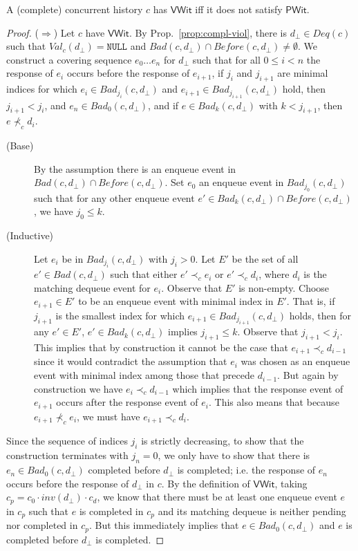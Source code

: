 \documentclass{LMCS}
\newcommand{\NULL}{\ensuremath{\mathtt{NULL}}}
\newcommand{\Deq}[1]{\ensuremath{\mathit{Deq}({#1})}}
\newcommand{\Before}[2]{\ensuremath{\mathit{Before}({#1},{#2})}}
\newcommand{\Val}[2]{\ensuremath{\mathit{Val}_{#1}({#2})}}
\newcommand{\Bad}[2]{\ensuremath{\mathit{Bad}(#1,#2)}}
\newcommand{\Badx}[3]{\ensuremath{\mathit{Bad}_{#3}(#1,#2)}}
\newcommand{\dhat}{\ensuremath{d_{\bot}}}
\newcommand\mylabel[1]{\label{#1}}
\newcommand{\VWit}{\ensuremath{\mathsf{VWit}}}
\newcommand{\PWit}{\ensuremath{\mathsf{PWit}}}
\begin{document}
\begin{lem}\mylabel{lem:vwit-pwit}
A (complete) concurrent history $c$ has {\VWit} iff it does not satisfy {\PWit}.
\end{lem}
\begin{proof}
($\Rightarrow$)
Let $c$ have {\VWit}.
By Prop.~\ref{prop:compl-viol}, there is $\dhat\in \Deq c$ such that $\Val c \dhat=\NULL$ and $\Bad c {\dhat}\cap \Before c {\dhat}\neq \emptyset$.
We construct a covering sequence $e_0\ldots e_n$ for $\dhat$ such that for all $0\leq i< n$ the response of $e_i$ occurs before the response of $e_{i+1}$, if $j_i$ and $j_{i+1}$ are minimal indices for which $e_i\in \Badx c {\dhat} {j_i}$ and $e_{i+1}\in \Badx c {\dhat} {j_{i+1}}$ hold, then $j_{i+1}<j_i$, and $e_n\in \Badx c {\dhat} 0$, and if $e\in \Badx c {\dhat} k$ with $k<j_{i+1}$, then $e\not\prec_c d_i$.

\begin{description}
\item[(Base)] By the assumption there is an enqueue event in $\Bad c {\dhat}\cap \Before c {\dhat}$.
Set $e_0$ an enqueue event in $\Badx c {\dhat} {j_0}$ such that for any other enqueue event $e'\in \Badx c {\dhat} k\cap \Before c {\dhat}$, we have $j_0\leq k$.

\item[(Inductive)] Let $e_i$ be in $\Badx c {\dhat} {j_i}$ with $j_i>0$.
Let $E'$ be the set of all $e'\in \Bad c {\dhat}$ such that either $e'\prec_c e_i$ or $e'\prec_c d_i$, where $d_i$ is the matching dequeue event for $e_i$.
Observe that $E'$ is non-empty.
Choose $e_{i+1}\in E'$ to be an enqueue event with minimal index in $E'$.
That is, if $j_{i+1}$ is the smallest index for which $e_{i+1}\in \Badx c {\dhat} {j_{i+1}}$ holds, then for any $e'\in E'$, $e' \in \Badx c {\dhat} k$ implies $j_{i+1}\leq k$.
Observe that $j_{i+1}<j_i$.
This implies that by construction it cannot be the case that $e_{i+1}\prec_c d_{i-1}$ since it would contradict the assumption that $e_i$ was chosen as an enqueue event with minimal index among those that precede $d_{i-1}$.
But again by construction we have $e_i\prec_c d_{i-1}$ which implies that the response event of $e_{i+1}$ occurs after the response event of $e_i$.
This also means that because $e_{i+1}\not\prec_c e_i$, we must have $e_{i+1}\prec_c d_i$. 

\end{description}
Since the sequence of indices $j_i$ is strictly decreasing, to show that the construction terminates with $j_n=0$, we only have to show that there is $e_n\in \Badx c {\dhat} 0$ completed before $\dhat$ is completed; i.e. the response of $e_n$ occurs before the response of $\dhat$ in $c$.
By the definition of {\VWit}, taking $c_p=c_0\cdot inv(\dhat)\cdot c_d$, we know that there must be at least one enqueue event $e$ in $c_p$ such that $e$ is completed in $c_p$ and its matching dequeue is neither pending nor completed in $c_p$. 
But this immediately implies that $e\in \Badx c {\dhat} 0$ and $e$ is completed before $\dhat$ is completed.



\end{proof}
\end{document}
